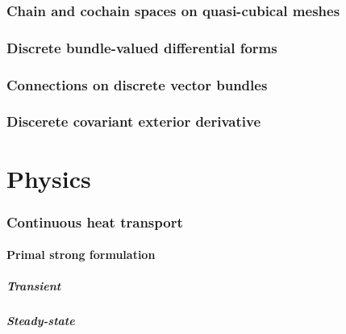 \documentclass{article}
\theoremstyle{definition}
\begin{document}
\section{Chain and cochain spaces on quasi-cubical meshes}
\label{section:chain_and_cochain_spaces_on_quasi-cubical_meshes}


\section{Discrete bundle-valued differential forms}
\label{section:discrete_bundle-valued_differential_forms}


\section{Connections on discrete vector bundles}
\label{section:connections_on_discrete_vector_bundles}


\section{Discerete covariant exterior derivative}
\label{section:discrete_covariant_exterior_derivative}


\part{Physics}

\section{Continuous heat transport}
\label{section:continuous_diffusion}


\subsection{Primal strong formulation}
\subsubsection{Transient}
\phantom{T}

\subsubsection{Steady-state}

\end{document}
